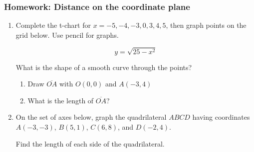 \documentclass[12pt, twoside]{article}
\begin{document}
\begin{enumerate}
  \end{enumerate}

\newpage

\subsubsection*{Homework: Distance on the coordinate plane}
  \begin{enumerate}

    \item Complete the t-chart for $x=-5,-4,-3,0,3,4,5$, then graph points on the grid below. Use pencil for graphs.

        \[y = \sqrt{25-x^2}\]

        What is the shape of a smooth curve through the points?
      \begin{center} %
      \end{center}

    \begin{enumerate}
      \item Draw $\overline{OA}$ with $O(0,0)$ and $A(-3,4)$
      \item What is the length of $\overline{OA}$? \vspace{1.5cm}
    \end{enumerate}



\newpage

  \item On the set of axes below, graph the quadrilateral $ABCD$ having coordinates $A(-3,-3)$, $B(5,1)$, $C(6,8)$, and $D(-2,4)$.
    \begin{center} %
    \end{center}
    Find the length of each side of the quadrilateral.



  \end{enumerate}

  
\end{document}
